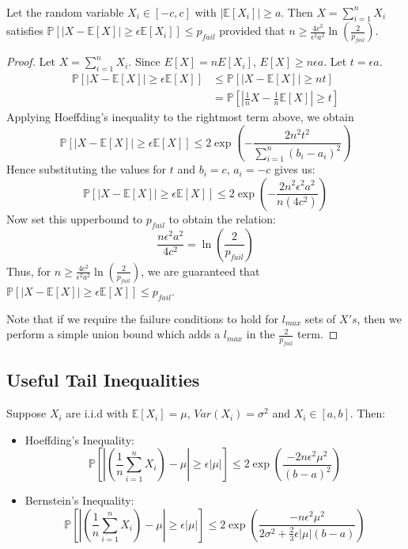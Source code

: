 \
\begin{lemma} 
Let the random variable $X_i \in [-c, c]$ with $|\mathbb{E}[X_i]| \geq a$. Then $X = \sum_{i= 1}^n X_i$ satisfies
$\mathbb{P}[|X - \mathbb{E}[X]| \geq \epsilon \mathbb{E}[X_i] ] \leq p_{fail}$ provided that
$n \geq \frac{4c^2}{\epsilon^2 a^2}\ln\left(\frac{2}{p_{fail}} \right)$.
\end{lemma}

\begin{proof}
Let $X = \sum_{i=1}^n X_i$.  Since $E[X] = nE[X_i]$, $E[X] \geq n \epsilon a$. Let $t = \epsilon a$.
\begin{align*}
\mathbb{P}\left[|X - \mathbb{E}[X]| \geq \epsilon \mathbb{E}[X] \right] 
&\leq \mathbb{P}\left[|X - \mathbb{E}[X]| \geq nt \right] \\
&= \mathbb{P}\left[\left|\frac{1}{n}X - \frac{1}{n}\mathbb{E}[X]\right| \geq t \right]  
\end{align*}
Applying Hoeffding's inequality to the rightmost term above, we obtain
  \[\mathbb{P}\left[|X - \mathbb{E}[X]| \geq \epsilon \mathbb{E}[X] \right] \leq 2\exp \left(-\frac{2n^2t^2}{\sum_{i=1}^n(b_i - a_i)^2}\right) \]
  Hence substituting the values for $t$ and $b_i = c$, $a_i = -c$ gives us:
\[\mathbb{P}\left[|X - \mathbb{E}[X]| \geq \epsilon \mathbb{E}[X] \right] \leq 2\exp \left(-\frac{2n^2\epsilon^2a^2}{n(4c^2)}\right) \]
Now set this upperbound to $p_{fail}$ to obtain the relation:
$$ \frac{n \epsilon^2 a^2}{4c^2} = \ln\left(\frac{2}{p_{fail}} \right) $$
Thus, for $n \geq \frac{4c^2}{\epsilon^2 a^2}\ln\left(\frac{2}{p_{fail}} \right)$, we are guaranteed that $\mathbb{P}\left[|X - \mathbb{E}[X]| \geq \epsilon \mathbb{E}[X] \right] \leq p_{fail}$.

Note that if we require the failure conditions to hold for $l_{max}$ sets of $X's$, then we perform a simple union bound which adds a $l_{max}$ in the $\frac{2}{p_{fail}}$ term.
\end{proof} 

\subsection{Useful Tail Inequalities}
Suppose $X_i$ are i.i.d with $\mathbb{E}[X_i]=\mu$, $Var(X_i)=\sigma^2$ and $X_i\in [a,b]$. Then:
\begin{itemize}
\item Hoeffding's Inequality:
\begin{equation*}
\mathbb{P}\left[\left|\left(\frac{1}{n}\sum_{i=1}^nX_i\right)-\mu \right|\geq\epsilon|\mu|\right]\leq
2\exp\left(\frac{-2n\epsilon^2\mu^2}{(b-a)^2}\right)
\end{equation*}
\item Bernstein's Inequality: 
\begin{equation*}
\mathbb{P}\left[\left|\left(\frac{1}{n}\sum_{i=1}^nX_i\right)-\mu\right|\geq\epsilon|\mu|\right]\leq
2\exp\left(\frac{-n\epsilon^2\mu^2}{2\sigma^2+\frac{2}{3}\epsilon|\mu|(b-a)}\right)
\end{equation*}
\end{itemize}
